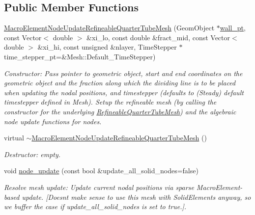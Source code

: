 \subsection*{Public Member Functions}
\begin{DoxyCompactItemize}
\item 
\hyperlink{classoomph_1_1MacroElementNodeUpdateRefineableQuarterTubeMesh_a05355134c7930d4aa73969f6c743ed17}{Macro\+Element\+Node\+Update\+Refineable\+Quarter\+Tube\+Mesh} (Geom\+Object $\ast$\hyperlink{classoomph_1_1QuarterTubeMesh_af59c4cde343ddd76caea4bc8c8ad8b94}{wall\+\_\+pt}, const Vector$<$ double $>$ \&xi\+\_\+lo, const double \&fract\+\_\+mid, const Vector$<$ double $>$ \&xi\+\_\+hi, const unsigned \&nlayer, Time\+Stepper $\ast$time\+\_\+stepper\+\_\+pt=\&Mesh\+::\+Default\+\_\+\+Time\+Stepper)
\begin{DoxyCompactList}\small\item\em Constructor\+: Pass pointer to geometric object, start and end coordinates on the geometric object and the fraction along which the dividing line is to be placed when updating the nodal positions, and timestepper (defaults to (Steady) default timestepper defined in Mesh). Setup the refineable mesh (by calling the constructor for the underlying \hyperlink{classoomph_1_1RefineableQuarterTubeMesh}{Refineable\+Quarter\+Tube\+Mesh}) and the algebraic node update functions for nodes. \end{DoxyCompactList}\item 
virtual \hyperlink{classoomph_1_1MacroElementNodeUpdateRefineableQuarterTubeMesh_ae4a4028ac41a7721c87bd484be894d02}{$\sim$\+Macro\+Element\+Node\+Update\+Refineable\+Quarter\+Tube\+Mesh} ()
\begin{DoxyCompactList}\small\item\em Destructor\+: empty. \end{DoxyCompactList}\item 
void \hyperlink{classoomph_1_1MacroElementNodeUpdateRefineableQuarterTubeMesh_a6255c22765a484ac11642ade0c084082}{node\+\_\+update} (const bool \&update\+\_\+all\+\_\+solid\+\_\+nodes=false)
\begin{DoxyCompactList}\small\item\em Resolve mesh update\+: Update current nodal positions via sparse Macro\+Element-\/based update. \mbox{[}Doesn\textquotesingle{}t make sense to use this mesh with Solid\+Elements anyway, so we buffer the case if update\+\_\+all\+\_\+solid\+\_\+nodes is set to true.\mbox{]}. \end{DoxyCompactList}\end{DoxyCompactItemize}
